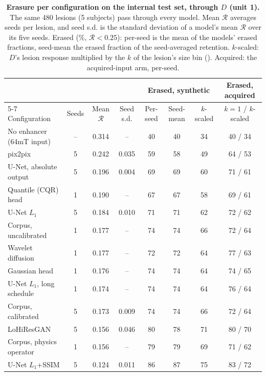 \begin{table}[!htbp]
{\caption{\textbf{Erasure per configuration on the internal test set, through $D$ (unit 1).} The same 480 lesions (5 subjects) pass through every model. Mean $\mathcal{R}$ averages seeds per lesion, and seed s.d. is the standard deviation of a model's mean $\mathcal{R}$ over its five seeds. Erased (\%, $\mathcal{R}<0.25$): per-seed is the mean of the models' erased fractions, seed-mean the erased fraction of the seed-averaged retention. $k$-scaled: $D$'s lesion response multiplied by the $k$ of the lesion's size bin (). Acquired: the acquired-input arm, per-seed.}}
{\scriptsize\setlength{\tabcolsep}{3pt}\begin{tabular*}{\linewidth}{@{\extracolsep{\fill}}lccccccc@{}}
\toprule
& & & & \multicolumn{3}{c}{Erased, synthetic} & Erased, acquired \\ \cmidrule(lr){5-7}
Configuration & Seeds & Mean $\mathcal{R}$ & Seed s.d. & Per-seed & Seed-mean & $k$-scaled & $k{=}1$ / $k$-scaled \\
\midrule
No enhancer (64mT input) & -- & 0.314 & -- & 40 & 40 & 34 & 40 / 34 \\
\midrule
pix2pix & 5 & 0.242 & 0.035 & 59 & 58 & 49 & 64 / 53 \\
U-Net, absolute output & 5 & 0.196 & 0.004 & 69 & 69 & 60 & 71 / 61 \\
Quantile (CQR) head & 1 & 0.190 & -- & 67 & 67 & 58 & 69 / 61 \\
U-Net $L_1$ & 5 & 0.184 & 0.010 & 71 & 71 & 62 & 72 / 62 \\
Corpus, uncalibrated & 1 & 0.177 & -- & 74 & 74 & 66 & 72 / 64 \\
Wavelet diffusion & 1 & 0.177 & -- & 72 & 72 & 64 & 77 / 63 \\
Gaussian head & 1 & 0.176 & -- & 74 & 74 & 64 & 74 / 65 \\
U-Net $L_1$, long schedule & 1 & 0.174 & -- & 74 & 74 & 64 & 76 / 64 \\
Corpus, calibrated & 5 & 0.173 & 0.009 & 74 & 74 & 66 & 72 / 64 \\
LoHiResGAN & 5 & 0.156 & 0.046 & 80 & 78 & 71 & 80 / 70 \\
Corpus, physics operator & 1 & 0.156 & -- & 79 & 79 & 69 & 71 / 62 \\
U-Net $L_1$+SSIM & 5 & 0.124 & 0.011 & 86 & 87 & 75 & 83 / 72 \\
\bottomrule
\end{tabular*}}
\end{table}
